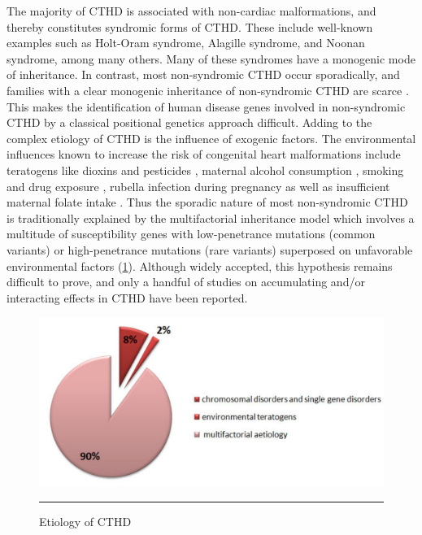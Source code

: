 \begin{refsection}
The majority of CTHD is associated with non-cardiac malformations, and thereby constitutes syndromic forms of CTHD. These include well-known examples such as Holt-Oram syndrome, Alagille syndrome, and Noonan syndrome, among many others. Many of these syndromes have a monogenic mode of inheritance. In contrast, most non-syndromic CTHD occur sporadically, and families with a clear monogenic inheritance of non-syndromic CTHD are scarce \cite{nora1968multifactorial,emanuel1970genetics,gill2003patterns,burn1998recurrence,oyen2009recurrence}. This makes the identification of human disease genes involved in non-syndromic CTHD by a classical positional genetics approach difficult. 
Adding to the complex etiology of CTHD is the influence of exogenic factors. The environmental influences known to increase the risk of congenital heart malformations include teratogens like dioxins and pesticides \cite{kopf2009overview}, maternal alcohol consumption \cite{burd2007congenital}, smoking \cite{alverson2011maternal} and drug exposure \cite{cassina2013pregnancy,jentink2010valproic}, rubella infection during pregnancy \cite{dewan2012burden} as well as insufficient maternal folate intake \cite{ionescu2009prevalence,van2010protective}. 
Thus the sporadic nature of most non-syndromic CTHD is traditionally explained by the multifactorial inheritance model which involves a multitude of susceptibility genes with low-penetrance mutations (common variants) or high-penetrance mutations (rare variants) superposed on unfavorable environmental factors (\cref{fig:1_4}). Although widely accepted, this hypothesis remains difficult to prove, and only a handful of studies on accumulating and/or interacting effects in CTHD have been reported.

\begin{figure}[!tb]
\centering
\includegraphics[scale=0.5,keepaspectratio]{Figures/Figure1_4.pdf}
\rule{35em}{0.5pt}
\caption{Etiology of CTHD \cite{nora1968multifactorial}}
\label{fig:1_4}
\end{figure}


\end{refsection}
